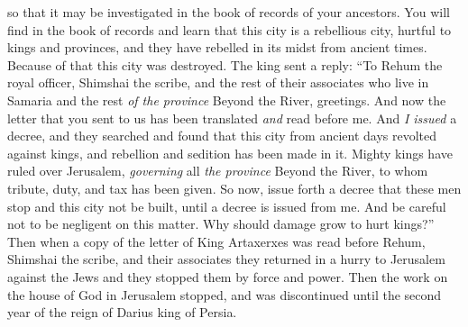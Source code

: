 \begin{biblechapter}
\verse so that it may be investigated in the book of records of your ancestors. You will find in the book of records and learn that this city is a rebellious city, hurtful to kings and provinces, and they have rebelled in its midst from ancient times. Because of that this city was destroyed.
\verse The king sent a reply: “To Rehum the royal officer, Shimshai the scribe, and the rest of their associates who live in Samaria and the rest \textit{of the province} Beyond the River, greetings. And now
\verse the letter that you sent to us has been translated \textit{and} read before me.
\verse And \textit{I issued} a decree, and they searched and found that this city from ancient days revolted against kings, and rebellion and sedition has been made in it.
\verse Mighty kings have ruled over Jerusalem, \textit{governing} all \textit{the province} Beyond the River, to whom tribute, duty, and tax has been given.
\verse So now, issue forth a decree that these men stop and this city not be built, until a decree is issued from me.
\verse And be careful not to be negligent on this matter. Why should damage grow to hurt kings?”
\verse Then when a copy of the letter of King Artaxerxes was read before Rehum, Shimshai the scribe, and their associates they returned in a hurry to Jerusalem against the Jews and they stopped them by force and power.
\verse Then the work on the house of God in Jerusalem stopped, and was discontinued until the second year of the reign of Darius king of Persia.
\end{biblechapter}

